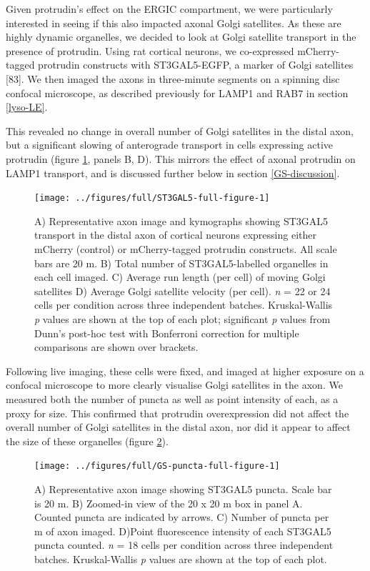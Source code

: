 \documentclass[
  12pt,
  a4paper,
]{book}
\begin{document}
Given protrudin's effect on the ERGIC compartment, we were particularly interested in seeing if this also impacted axonal Golgi satellites. As these are highly dynamic organelles, we decided to look at Golgi satellite transport in the presence of protrudin. Using rat cortical neurons, we co-expressed mCherry-tagged protrudin constructs with ST3GAL5-EGFP, a marker of Golgi satellites {[}83{]}. We then imaged the axons in three-minute segments on a spinning disc confocal microscope, as described previously for LAMP1 and RAB7 in section \ref{lyso-LE}.

This revealed no change in overall number of Golgi satellites in the distal axon, but a significant slowing of anterograde transport in cells expressing active protrudin (figure \ref{fig:ST3GAL5-full-figure}, panels B, D). This mirrors the effect of axonal protrudin on LAMP1 transport, and is discussed further below in section \ref{GS-discussion}.



\begin{figure}
\texttt{[image: ../figures/full/ST3GAL5-full-figure-1]} \caption[Protrudin effect on Golgi satellite (ST3GAL5) transport in the distal axon]{A) Representative axon image and kymographs showing ST3GAL5 transport in the distal axon of cortical neurons expressing either mCherry (control) or mCherry-tagged protrudin constructs. All scale bars are 20 \textmu{}m. B) Total number of ST3GAL5-labelled organelles in each cell imaged. C) Average run length (per cell) of moving Golgi satellites D) Average Golgi satellite velocity (per cell). \emph{n} = 22 or 24 cells per condition across three independent batches. Kruskal-Wallis \emph{p} values are shown at the top of each plot; significant \emph{p} values from Dunn's post-hoc test with Bonferroni correction for multiple comparisons are shown over brackets.}\label{fig:ST3GAL5-full-figure}
\end{figure}

Following live imaging, these cells were fixed, and imaged at higher exposure on a confocal microscope to more clearly visualise Golgi satellites in the axon. We measured both the number of puncta as well as point intensity of each, as a proxy for size. This confirmed that protrudin overexpression did not affect the overall number of Golgi satellites in the distal axon, nor did it appear to affect the size of these organelles (figure \ref{fig:GS-puncta-full-figure}).



\begin{figure}
\texttt{[image: ../figures/full/GS-puncta-full-figure-1]} \caption[Protrudin effect on Golgi satellite abundance and size in the distal axon]{A) Representative axon image showing ST3GAL5 puncta. Scale bar is 20 \textmu{}m. B) Zoomed-in view of the 20 x 20 \textmu{}m box in panel A. Counted puncta are indicated by arrows. C) Number of puncta per \textmu{}m of axon imaged. D)Point fluorescence intensity of each ST3GAL5 puncta counted. \emph{n} = 18 cells per condition across three independent batches. Kruskal-Wallis \emph{p} values are shown at the top of each plot.}\label{fig:GS-puncta-full-figure}
\end{figure}
\end{document}
